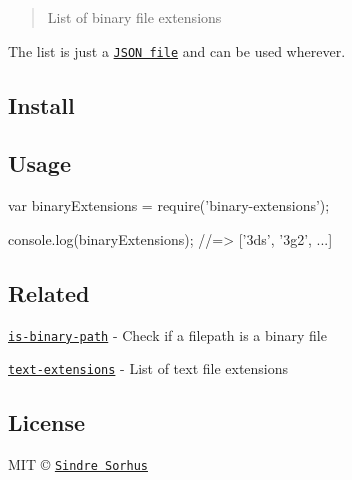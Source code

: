\begin{quote}
List of binary file extensions \end{quote}


The list is just a \href{binary-extensions.json}{\tt J\+S\+ON file} and can be used wherever.

\subsection*{Install}




\subsection*{Usage}


\begin{DoxyCode}
var binaryExtensions = require('binary-extensions');

console.log(binaryExtensions);
//=> ['3ds', '3g2', ...]
\end{DoxyCode}


\subsection*{Related}


\begin{DoxyItemize}
\item \href{https://github.com/sindresorhus/is-binary-path}{\tt {\ttfamily is-\/binary-\/path}} -\/ Check if a filepath is a binary file
\item \href{https://github.com/sindresorhus/text-extensions}{\tt {\ttfamily text-\/extensions}} -\/ List of text file extensions
\end{DoxyItemize}

\subsection*{License}

M\+IT © \href{http://sindresorhus.com}{\tt Sindre Sorhus} 